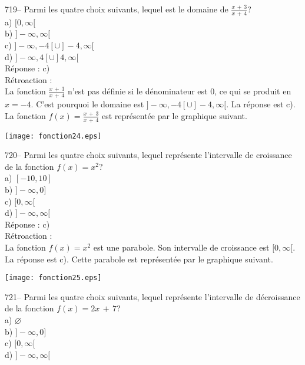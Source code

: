 ﻿\documentclass[letterpaper, 12pt]{article}
\begin{document}
719-- Parmi les quatre choix suivants, lequel est le domaine de
$\frac{x\,+\,3}{x\,+\,4}$?\\
a) $[0,\infty[$\\
b) $]-\infty, \infty[$\\
c) $]-\infty,-4[ \cup ]-4,\infty[$\\
d) $]-\infty,4[ \cup ]4,\infty[$\\

R\'eponse : c)\\

R\'etroaction :\\
La fonction $\frac{x\,+\,3}{x\,+\,4}$ n'est pas d\'efinie si le
d\'enominateur est 0, ce qui se produit en $x=-4$.  C'est pourquoi le
domaine est $]-\infty,-4[ \cup ]-4,\infty[$.  La r\'eponse est c).  La
fonction $f(x)=\frac{x\,+\,3}{x\,+\,4}$ est repr\'esent\'ee par le graphique
suivant.\\
    \begin{center}
    \texttt{[image: fonction24.eps]}
    \end{center}



720-- Parmi les quatre choix suivants, lequel repr\'esente l'intervalle de
croissance de la fonction $f(x)=x^{2}$?\\
a) $[-10,10]$\\
b) $]-\infty,0]$\\
c) $[0,\infty[$\\
d) $]-\infty,\infty[$\\

R\'eponse : c)\\

R\'etroaction : \\
La fonction $f(x)=x^{2}$ est une parabole.  Son intervalle de croissance est
$[0,\infty[$.  La r\'eponse est c).  Cette parabole est repr\'esent\'ee par
le graphique suivant.\\
    \begin{center}
    \texttt{[image: fonction25.eps]}
    \end{center}


721-- Parmi les quatre choix suivants, lequel repr\'esente l'intervalle de
d\'ecroissance de la fonction $f(x)=2x\,+\,7$?\\
a) $\varnothing$\\
b) $]-\infty,0]$\\
c) $[0,\infty[$\\
d) $]-\infty,\infty[$\\
\end{document}
